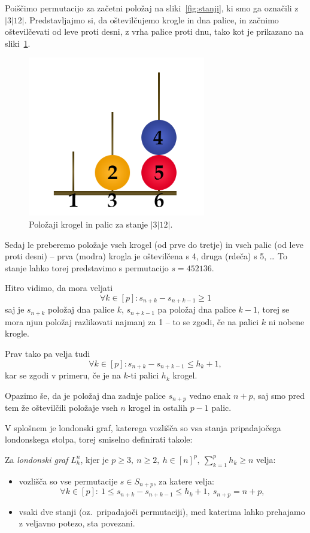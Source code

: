 \documentclass[twoside,11pt]{article}
\begin{document}
\begin{primer}
    Poiščimo permutacijo za začetni položaj na sliki~\ref{fig:stanji}, ki smo ga označili z $|3|12|$. 
    Predstavljajmo si, da oštevilčujemo krogle in dna palice, in začnimo oštevilčevati od leve proti desni, z vrha palice proti dnu, tako kot je prikazano na sliki~\ref{fig:ostev-stanji}.
    
    \begin{figure}[h]
        \includegraphics[width=220pt]{../img/london-tower-numbered.png}
        \caption{Položaji krogel in palic za stanje $|3|12|$.}
        \label{fig:ostev-stanji}
    \end{figure}
    
    Sedaj le preberemo položaje vseh krogel (od prve do tretje) in vseh palic (od leve proti desni) -- prva (modra) krogla je oštevilčena s 4, druga (rdeča) s 5, \ldots
    To stanje lahko torej predstavimo s permutacijo $s=452136$.
\end{primer}

Hitro vidimo, da mora veljati 
\[\forall k \in [p]\colon s_{n+k} - s_{n+k-1} \geq 1 \]
saj je $s_{n+k}$ položaj dna palice $k$, $s_{n+k-1}$ pa položaj dna palice $k-1$, torej se mora njun položaj razlikovati najmanj za 1 -- to se zgodi, če na palici $k$ ni nobene krogle.

Prav tako pa velja tudi 
\[\forall k \in [p]\colon s_{n+k} - s_{n+k-1} \leq h_k + 1,\]
kar se zgodi v primeru, če je na $k$-ti palici $h_k$ krogel.

Opazimo še, da je položaj dna zadnje palice $s_{n+p}$ vedno enak $n+p$, saj smo pred tem že oštevilčili položaje vseh $n$ krogel in ostalih $p-1$ palic.

V splošnem je londonski graf, katerega vozlišča so vsa stanja pripadajočega londonskega stolpa, torej smiselno definirati takole:

\begin{definicija}
    Za \emph{londonski graf} $L_h^n$, kjer je $p \geq 3,\ n \geq 2,\ h \in [n]^p,\  \sum_{k=1}^p h_k \geq n$ velja:
    \begin{itemize}
        \item vozlišča so vse permutacije $s \in S_{n+p}$, za katere velja:
        \[\forall k \in [p]:\ 1 \leq s_{n+k} - s_{n+k-1} \leq h_k + 1,\ s_{n+p} = n + p ,\]
        \item vsaki dve stanji (oz.\ pripadajoči permutaciji), med katerima lahko prehajamo z veljavno potezo, sta povezani.
    \end{itemize}
\end{definicija}
\end{document}
